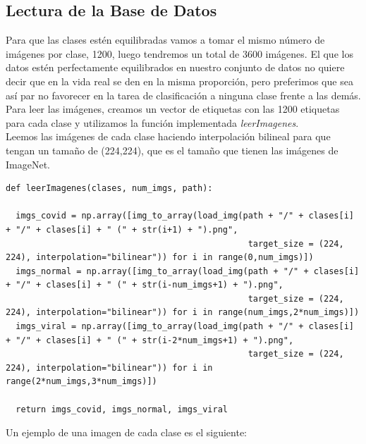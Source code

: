 \documentclass[11pt,a4paper]{article}
\theoremstyle{definition}
\begin{document}
\subsection{Lectura de la Base de Datos}

Para que las clases estén equilibradas vamos a tomar el mismo número de imágenes por clase, 1200, luego tendremos un total de 3600 imágenes.  El que los datos estén perfectamente equilibrados en nuestro conjunto de datos no quiere decir que en la vida real se den en la misma proporción,  pero preferimos que sea así par no favorecer en la tarea de clasificación a ninguna clase frente a las demás.\\

Para leer las imágenes, creamos un vector de etiquetas con las 1200 etiquetas para cada clase y utilizamos la función implementada \textit{leerImagenes}.\\

Leemos las imágenes de cada clase haciendo interpolación bilineal para que tengan un tamaño de (224,224), que es el tamaño que tienen las imágenes de ImageNet.\\
\begin{lstlisting}
def leerImagenes(clases, num_imgs, path):

  imgs_covid = np.array([img_to_array(load_img(path + "/" + clases[i] + "/" + clases[i] + " (" + str(i+1) + ").png",
                                                target_size = (224, 224), interpolation="bilinear")) for i in range(0,num_imgs)])
  imgs_normal = np.array([img_to_array(load_img(path + "/" + clases[i] + "/" + clases[i] + " (" + str(i-num_imgs+1) + ").png",
                                                target_size = (224, 224), interpolation="bilinear")) for i in range(num_imgs,2*num_imgs)])
  imgs_viral = np.array([img_to_array(load_img(path + "/" + clases[i] + "/" + clases[i] + " (" + str(i-2*num_imgs+1) + ").png",
                                                target_size = (224, 224), interpolation="bilinear")) for i in range(2*num_imgs,3*num_imgs)])

  return imgs_covid, imgs_normal, imgs_viral
\end{lstlisting}

Un ejemplo de una imagen de cada clase es el siguiente:
\end{document}
